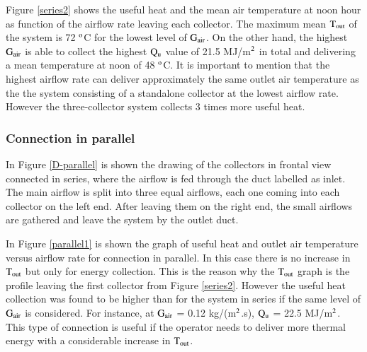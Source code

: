 Figure \ref{series2} shows the useful heat and the mean air temperature at noon hour as function of the airflow rate leaving each collector. The maximum mean $\rm{T_{out}}$ of the system is 72 $^{\rm{o}}$C for the lowest level of $\rm{G_{air}}$. On the other hand, the highest $\rm{G_{air}}$ is able to collect the highest $\rm{Q_{u}}$ value of 21.5 MJ/m$^{\rm 2}$ in total and delivering a mean temperature at noon of 48 $^{\rm{o}}$C. It is important to mention that the highest airflow rate can deliver approximately the same outlet air temperature as the the system consisting of a standalone collector at the lowest airflow rate. However the three-collector system collects 3 times more useful heat.  


\subsubsection{Connection in parallel}

In Figure \ref{D-parallel} is shown the drawing of the collectors in frontal view connected in series, where the airflow is fed through the duct labelled as inlet. The main airflow is split into three equal airflows, each one coming into each collector on the left end. After leaving them on the right end, the small airflows are gathered and leave the system by the outlet duct.


In Figure \ref{parallel1} is shown the graph of useful heat and outlet air temperature versus airflow rate for connection in parallel. In this case there is no increase in $\rm{T_{out}}$ but only for energy collection. This is the reason why the $\rm{T_{out}}$ graph is the profile leaving the first collector from Figure \ref{series2}. However the useful heat collection was found to be higher than for the system in series if the same level of $\rm{G_{air}}$ is considered. For instance, at $\rm{G_{air}}$ = 0.12 kg/(m$^{\rm 2}$.s), $\rm{Q_{u}}$ = 22.5 MJ/m$^{\rm 2}$. This type of connection is useful if the operator needs to deliver more thermal energy with a considerable increase in $\rm{T_{out}}$.


